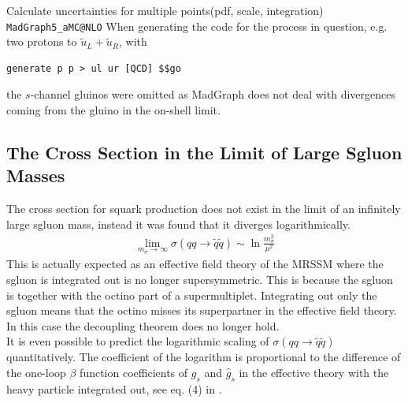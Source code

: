 Calculate uncertainties for multiple points(pdf, scale, integration)
\texttt{MadGraph5_aMC@NLO}\cite{Alwall:2014hca}
When generating the code for the process in question, e.g. two protons to $\tilde{u}_L + \tilde{u}_R$, with
\begin{lstlisting}
generate p p > ul ur [QCD] $$go
\end{lstlisting}
the $s$-channel gluinos were omitted as MadGraph does not deal with divergences coming from the gluino in the on-shell limit.




\subsection{The Cross Section in the Limit of Large Sgluon Masses}
The cross section for squark production does not exist in the limit of an infinitely large sgluon mass, instead it was found that it diverges logarithmically.\\
\begin{align}
\lim_{m_{\sigma}\to\infty} \sigma(qq \to \tilde{q}\tilde{q}) \sim \ln \frac{m_{\sigma}^2}{\mu^2}
\end{align}
This is actually expected as an effective field theory of the MRSSM where the sgluon is integrated out is no longer supersymmetric. This is because the sgluon is together with the octino part of a supermultiplet. Integrating out only the sgluon means that the octino misses its superpartner in the effective field theory. In this case the decoupling theorem \cite{Appelquist:1974tg} does no longer hold.\\
It is even possible to predict the  logarithmic scaling of $\sigma(qq \to \tilde{q}\tilde{q})$ quantitatively. The coefficient of the logarithm is proportional to the difference of the one-loop $\beta$ function coefficients of $g_s$ and $\hat{g}_s$ in the effective theory with the heavy particle integrated out, see eq. (4) in \cite{Cheng:1997sq}.
